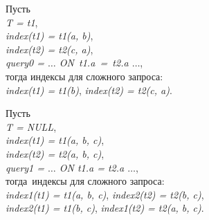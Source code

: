 Пусть \\
\textit{T = t1},\\
\textit{index(t1) = t1(a, b)},\\
\textit{index(t2) = t2(c, a)},\\
\textit{query0 = $\ldots$ ON t1.a = t2.a $\ldots$},\\
тогда индексы для сложного запроса: \\
\textit{index(t1) = t1(b)}, \textit{index(t2) = t2(c, a)}.


Пусть \\
\textit{T = NULL},\\
\textit{index(t1) = t1(a, b, c)},\\
\textit{index(t2) = t2(a, b, c)},\\
\textit{query1 = $\ldots$ ON t1.a = t2.a $\ldots$},\\
тогда индексы для сложного запроса: \\
\textit{index1(t1) = t1(a, b, c)}, \textit{index2(t2) = t2(b, c)},\\ 
\textit{index2(t1) = t1(b, c)}, \textit{index1(t2) = t2(a, b, c)}.


